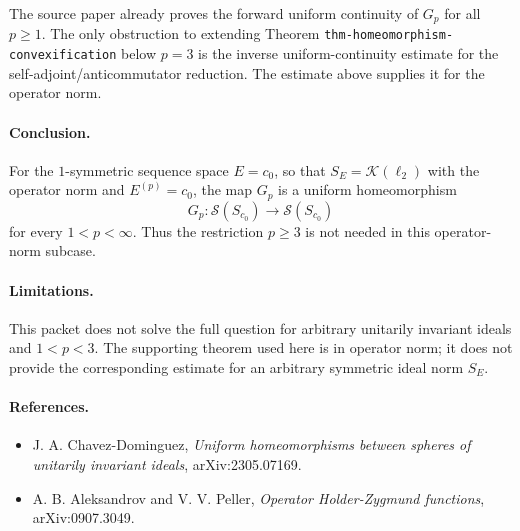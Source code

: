 \documentclass[11pt]{article}
\newcommand{\Sph}{\mathscr S}
\newcommand{\K}{\mathcal K}
\begin{document}
The source paper already proves the forward uniform continuity of \(G_p\)
for all \(p\ge1\).  The only obstruction to extending Theorem
\texttt{thm-homeomorphism-convexification} below \(p=3\) is the inverse
uniform-continuity estimate for the self-adjoint/anticommutator reduction.
The estimate above supplies it for the operator norm.

\paragraph{Conclusion.}
For the \(1\)-symmetric sequence space \(E=c_0\), so that \(S_E=\K(\ell_2)\)
with the operator norm and \(E^{(p)}=c_0\), the map \(G_p\) is a uniform
homeomorphism
\[
G_p:\Sph(S_{c_0})\longrightarrow \Sph(S_{c_0})
\]
for every \(1<p<\infty\).  Thus the restriction \(p\ge3\) is not needed in
this operator-norm subcase.

\paragraph{Limitations.}
This packet does not solve the full question for arbitrary unitarily
invariant ideals and \(1<p<3\).  The supporting theorem used here is in
operator norm; it does not provide the corresponding estimate for an
arbitrary symmetric ideal norm \(S_E\).

\paragraph{References.}
\begin{itemize}
\item J. A. Chavez-Dominguez, \emph{Uniform homeomorphisms between spheres
of unitarily invariant ideals}, arXiv:2305.07169.
\item A. B. Aleksandrov and V. V. Peller, \emph{Operator Holder-Zygmund
functions}, arXiv:0907.3049.
\end{itemize}
\end{document}
